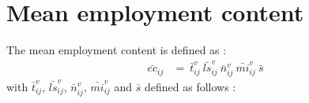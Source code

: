 \documentclass[12pt,english]{article}
\begin{document}
%
%
%


\clearpage

\newpage


\clearpage

\appendix

\section{Mean employment content} \label{ECmean}

The mean employment content is defined as :
\begin{align}
\bar{ec}_{ij} &=  \ \bar{t}^v_{ij} \ \bar{ls}^v_{ij} \ \bar{n}^v_{ij} \ \bar{mi}^v_{ij}  \ \bar{s} \nonumber
\end{align}
with $\bar{t}^v_{ij}$, $\bar{ls}^v_{ij}$, $\bar{n}^v_{ij}$, $\bar{mi}^v_{ij}$ and $\bar{s}$ defined as follows :
\end{document}
